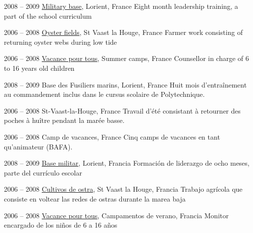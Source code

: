 \item[Commandos Marine]{2008 -- 2009}
  {
  \href{http://www.defense.gouv.fr/marine/organisation/forces/fusiliers-marins-et-commandos/force-maritime-des-fusiliers-marins-et-commandos}{Military base}, Lorient, France
  }
  {Eight ­month leadership training, a part of the school curriculum}


\item[Ostreiculture]{2006 -- 2008}
  {
  \href{http://huitresdesaintvaast.fr/}{Oyster fields}, St Vaast la Houge, France
  }
  {Farmer work consisting of returning oyster webs during low tide}


\item[Counsellor]{2006 -- 2008}
  {
  \href{http://www.vacances-pour-tous.org/}{Vacance pour tous}, Summer camps, France
  }
  {Counsellor in charge of 6 to 16 years old children}


\item[Commandos Marine]{2008 -- 2009}
	{Base des Fusiliers marins, Lorient, France}
	{Huit mois d'entraînement au commandement inclus dans le cursus scolaire de Polytechnique.}


\item[Ostreiculture]{2006 -- 2008}
	{St-Vaast-la-Houge, France}
	{Travail d'été consistant à retourner des poches à huître pendant la marée basse.}


\item[Animateur]{2006 -- 2008}
	{Camp de vacances, France}
	{Cinq camps de vacances en tant qu'animateur (BAFA).}


\item[Commandos Marine]{2008 -- 2009}
	{
	\href{http://www.defense.gouv.fr/marine/organisation/forces/fusiliers-marins-et-commandos/force-maritime-des-fusiliers-marins-et-commandos}{Base militar}, Lorient, Francia
	}
	{Formación de liderazgo de ocho meses, parte del currículo escolar}

\item[Ostrícultor]{2006 -- 2008}
	{
	\href{http://huitresdesaintvaast.fr/}{Cultivos de ostra}, St Vaast la Houge, Francia
	}
	{Trabajo agrícola que consiste en voltear las redes de ostras durante la marea baja}


\item[Animador]{2006 -- 2008}
	{
	\href{http://www.vacances-pour-tous.org/}{Vacance pour tous}, Campamentos de verano, Francia
	}
	{Monitor encargado de los niños de 6 a 16 años}
	
